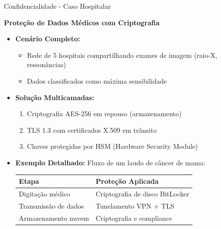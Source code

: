 \begin{frame}{Confidencialidade - Caso Hospitalar}
    \begin{block}{\textbf{Proteção de Dados Médicos com Criptografia}}
        \begin{itemize}
            \item \textbf{Cenário Completo:}
                  \begin{itemize}
                      \item[$\circ$] Rede de 5 hospitais compartilhando exames de imagem (raio-X, ressonâncias)
                      \item[$\circ$] Dados classificados como máxima sensibilidade
                  \end{itemize}

            \item \textbf{Solução Multicamadas:}
                  \begin{enumerate}
                      \item Criptografia AES-256 em repouso (armazenamento)
                      \item TLS 1.3 com certificados X.509 em trânsito
                      \item Chaves protegidas por HSM (Hardware Security Module)
                  \end{enumerate}

            \item \textbf{Exemplo Detalhado:} Fluxo de um laudo de câncer de mama:

                  \begin{tabular}{|l|l|}
                      \hline
                      \textbf{Etapa}       & \textbf{Proteção Aplicada}      \\ \hline
                      Digitação médico     & Criptografia de disco BitLocker \\ \hline
                      Transmissão de dados & Tunelamento VPN + TLS           \\ \hline
                      Armazenamento nuvem  & Criptografia e compliance       \\ \hline
                  \end{tabular}


        \end{itemize}
    \end{block}


\end{frame}

